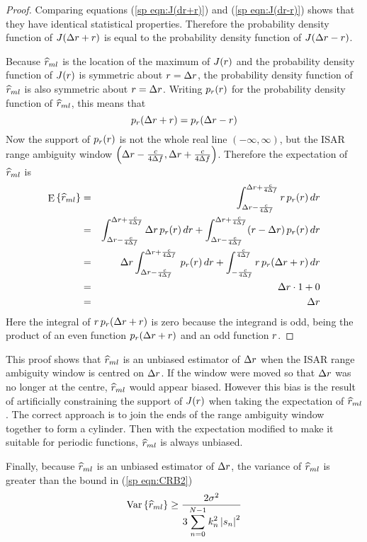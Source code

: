 \begin{proof}
Comparing equations (\ref{sp eqn:J(dr+r)}) and (\ref{sp eqn:J(dr-r)}) shows
that they have identical statistical properties.  Therefore the probability
density function of $J({\Delta r}+{r})$ is equal to the probability density
function of $J({\Delta r}-{r})$.

Because $\widehat{r}_{ml}$ is the location of the maximum of $J({r})$ and the probability
density function of $J({r})$ is symmetric about ${r}={\Delta r}$, the probability
density function of $\widehat{r}_{ml}$ is also symmetric about ${r}={\Delta r}$.  Writing
$p_{{r}}({r})$ for the probability density function of $\widehat{r}_{ml}$, this means
that
\begin{equation}
p_{{r}}({\Delta r}+{r})=p_{{r}}({\Delta r}-{r})
\end{equation}
Now the support of $p_{{r}}({r})$ is not the whole real line
$(-\infty,\infty)$, but the ISAR range ambiguity window 
$\left({\Delta r}-\frac{c}{4{\Delta f}},{\Delta r}+\frac{c}{4{\Delta f}}\right)$.
Therefore the expectation of $\widehat{r}_{ml}$ is
\begin{eqnarray}
{\mathop{\rm E}\nolimits\left\{\widehat{r}_{ml}\right\}}
&=&\int_{{\Delta r}-\frac{c}{4{\Delta f}}}^{{\Delta r}+\frac{c}{4{\Delta f}}} {r}\,p_{{r}}({r})\,d{r}{\nonumber}\\
&=&\int_{{\Delta r}-\frac{c}{4{\Delta f}}}^{{\Delta r}+\frac{c}{4{\Delta f}}} {\Delta r}\,p_{{r}}({r})\,d{r}
+\int_{{\Delta r}-\frac{c}{4{\Delta f}}}^{{\Delta r}+\frac{c}{4{\Delta f}}} ({r}-{\Delta r})\,p_{{r}}({r})\,d{r}{\nonumber}\\
&=&{\Delta r}\int_{{\Delta r}-\frac{c}{4{\Delta f}}}^{{\Delta r}+\frac{c}{4{\Delta f}}} \,p_{{r}}({r})\,d{r}
+\int_{-\frac{c}{4{\Delta f}}}^{\frac{c}{4{\Delta f}}} {r}\,p_{{r}}({\Delta r}+{r})\,d{r}{\nonumber}\\
&=&{\Delta r}\cdot 1+0{\nonumber}\\
&=&{\Delta r}
\end{eqnarray}
Here the integral of ${r}\,p_{{r}}({\Delta r}+{r})$ is zero because the integrand is
odd, being the product of an even function $p_{{r}}({\Delta r}+{r})$ and an odd 
function ${r}$.
\end{proof}

This proof shows that $\widehat{r}_{ml}$ is an unbiased estimator of ${\Delta r}$ when the ISAR
range ambiguity window is centred on ${\Delta r}$.  If the window were moved so that
${\Delta r}$ was no longer at the centre, $\widehat{r}_{ml}$ would appear biased.  However this
bias is the result of artificially constraining the support of $J({r})$ when
taking the expectation of $\widehat{r}_{ml}$.  The correct approach is to join the ends
of the range ambiguity window together to form a cylinder.  Then with
the expectation modified to make it suitable for periodic functions,
$\widehat{r}_{ml}$ is always unbiased.

Finally, because $\widehat{r}_{ml}$ is an unbiased estimator of ${\Delta r}$, the variance of 
$\widehat{r}_{ml}$ is greater than the \CR bound in (\ref{sp eqn:CRB2})
\begin{equation}
{\mathop{\rm Var}\nolimits\left\{\widehat{r}_{ml}\right\}}\geq\frac{2{\sigma^2}}{3\displaystyle\sum_{n=0}^{N-1}k_n^2\left|s_n\right|^2}
\end{equation}

